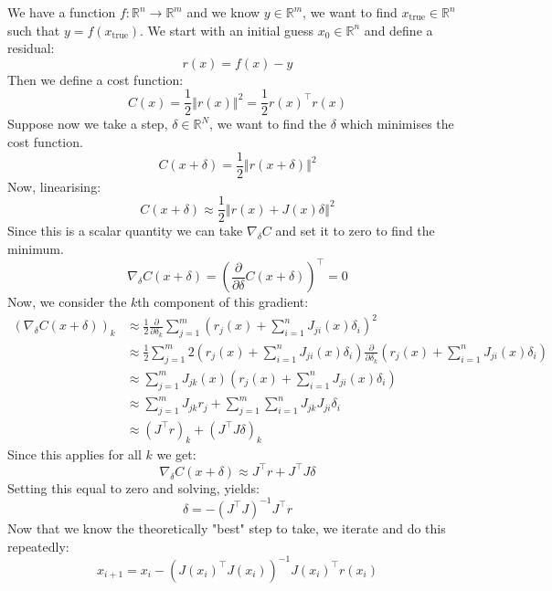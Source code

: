 We have a function $f : \mathbb{R}^n \rightarrow \mathbb{R}^m$ and we know $y \in \mathbb{R}^m$, we want to find $x_{\text{true}} \in \mathbb{R}^n$ such that $y = f(x_{\text{true}})$. We start with an initial guess $x_0 \in \mathbb{R}^n$ and define a residual:
\begin{equation}
  r(x) = f(x) - y
\end{equation}
Then we define a cost function: 
\begin{equation}
  C(x) = \frac{1}{2} \left \Vert r(x) \right \Vert^2 = \frac{1}{2} r(x)^{\top}r(x)
  \label{eq:cost_function}
\end{equation}
Suppose now we take a step, $\delta \in \mathbb{R}^N$, we want to find the $\delta$ which minimises the cost function.
\begin{equation}
  C(x + \delta) = \frac{1}{2} \left\Vert r(x + \delta) \right\Vert^2 
\end{equation}
Now, linearising:
\begin{equation}
  C(x + \delta) \approx \frac{1}{2} \left\Vert r(x) + J(x)\delta \right\Vert^2 
\end{equation}
Since this is a scalar quantity we can take $\nabla_\delta C$ and set it to zero to find the minimum.
\begin{equation}
  \nabla_\delta C(x + \delta) = \left(\frac{\partial}{\partial \delta} C(x + \delta)\right)^\top = 0
\end{equation}
Now, we consider the $k$th component of this gradient:
\begin{align}
  \left(\nabla_\delta C(x + \delta)\right)_k
    &\approx \frac{1}{2}\frac{\partial}{\partial \delta_k} \sum_{j = 1}^{m} \left(r_j(x) + \sum_{i=1}^n J_{ji}(x)\delta_i \right)^2 \\
    &\approx \frac{1}{2} \sum_{j = 1}^m 2\left(r_j(x) + \sum_{i=1}^n J_{ji}(x)\delta_i\right)\frac{\partial}{\partial \delta_k}\left(r_j(x) + \sum_{i=1}^n J_{ji}(x)\delta_i\right) \\
    &\approx \sum_{j = 1}^m J_{jk}(x)\left(r_j(x) + \sum_{i=1}^n J_{ji}(x)\delta_i\right) \\
    &\approx \sum_{j = 1}^m J_{jk} r_j + \sum_{j = 1}^m \sum_{i=1}^n J_{jk} J_{ji}\delta_i \\
    &\approx \left( J^\top r \right)_k + (J^\top J \delta)_k
\end{align}
Since this applies for all $k$ we get:
\begin{equation}
  \nabla_\delta C(x + \delta) \approx J^\top r + J^\top J \delta
\end{equation}
Setting this equal to zero and solving, yields:
\begin{equation}
  \delta = -\left(J^\top J\right)^{-1} J^\top r 
\end{equation}
Now that we know the theoretically "best" step to take, we iterate and do this repeatedly:
\begin{equation}
  x_{i + 1} = x_i - \left(J(x_i)^\top J(x_i)\right)^{-1}J(x_i)^\top r(x_i)
\end{equation}

